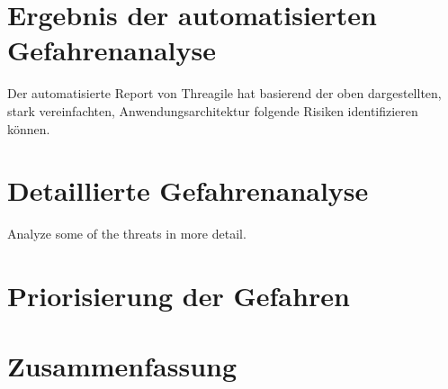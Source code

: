 \documentclass{article}
\begin{document}
\section{Ergebnis der automatisierten Gefahrenanalyse}

Der automatisierte Report von Threagile hat basierend der oben dargestellten, stark 
vereinfachten, Anwendungsarchitektur folgende Risiken identifizieren können.

\subsection{}

\section{Detaillierte Gefahrenanalyse}

Analyze some of the threats in more detail.

\section{Priorisierung der Gefahren}

\section{Zusammenfassung}

\end{document}
